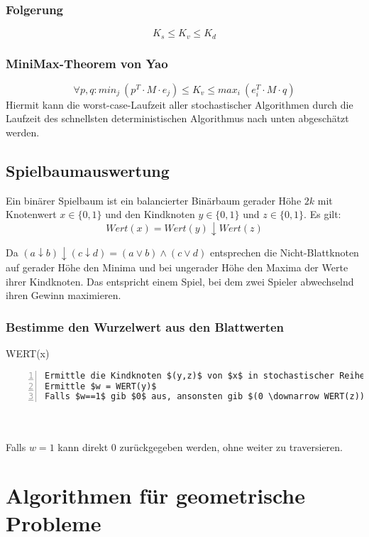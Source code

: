 \subsubsection{Folgerung}
\[K_s \leq K_v \leq K_d\]

\subsubsection{MiniMax-Theorem von Yao}
\[\forall p,q: min_j~(p^T \cdot M \cdot e_j) \leq K_v \leq max_i~(e_i^T \cdot M \cdot q)\]
Hiermit kann die worst-case-Laufzeit aller stochastischer Algorithmen durch die Laufzeit des schnellsten deterministischen Algorithmus nach unten abgeschätzt werden.


\subsection{Spielbaumauswertung}
Ein binärer Spielbaum ist ein balancierter Binärbaum gerader Höhe \(2k\) mit Knotenwert \(x \in \{0,1\}\) und den Kindknoten \(y \in \{0,1\}\) und \(z \in \{0,1\}\). Es gilt:
\[Wert(x) = Wert(y) \downarrow Wert(z)\]

Da \((a \downarrow b) \downarrow (c \downarrow d) = (a \vee b) \wedge (c \vee d)\) entsprechen die Nicht-Blattknoten auf gerader Höhe den Minima und bei ungerader Höhe den Maxima der Werte ihrer Kindknoten. Das entspricht einem Spiel, bei dem zwei Spieler abwechselnd ihren Gewinn maximieren.

\subsubsection{Bestimme den Wurzelwert aus den Blattwerten}
\begin{minipage}{\textwidth}
WERT(x)
\begin{lstlisting}[frame=single,numbers=left,mathescape]
Ermittle die Kindknoten $(y,z)$ von $x$ in stochastischer Reihenfolge
Ermittle $w = WERT(y)$
Falls $w==1$ gib $0$ aus, ansonsten gib $(0 \downarrow WERT(z))$ aus
\end{lstlisting}
\end{minipage}
\\\\
Falls \(w=1\) kann direkt \(0\) zurückgegeben werden, ohne weiter zu traversieren.



\section{Algorithmen für geometrische Probleme}

